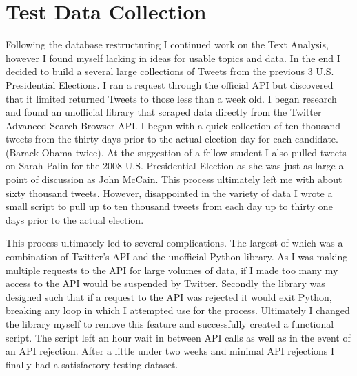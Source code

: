 \documentclass[12pt,a4paper]{report}
\begin{document}
  \section{Test Data Collection}
  Following the database restructuring I continued work on the Text Analysis, however I found myself lacking in ideas for usable topics and data. In the end I decided to build a several large collections of Tweets from the previous 3 U.S. Presidential Elections. I ran a request through the official API but discovered that it limited returned Tweets to those less than a week old. I began research and found an unofficial library that scraped data directly from the Twitter Advanced Search Browser API. I began with a quick collection of ten thousand tweets from the thirty days prior to the actual election day for each candidate. (Barack Obama twice). At the suggestion of a fellow student I also pulled tweets on Sarah Palin for the 2008 U.S. Presidential Election as she was just as large a point of discussion as John McCain. This process ultimately left me with about sixty thousand tweets. However, disappointed in the variety of data I wrote a small script to pull up to ten thousand tweets from each day up to thirty one days prior to the actual election. 
  \par
  This process ultimately led to several complications. The largest of which was a combination of Twitter’s API and the unofficial Python library. As I was making multiple requests to the API for large volumes of data, if I made too many my access to the API would be suspended by Twitter. Secondly the library was designed such that if a request to the API was rejected it would exit Python, breaking any loop in which I attempted use for the process. Ultimately I changed the library myself to remove this feature and successfully created a functional script. The script left an hour wait in between API calls as well as in the event of an API rejection. After a little under two weeks and minimal API rejections I finally had a satisfactory testing dataset.
\end{document}
